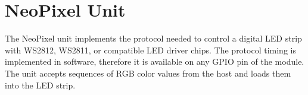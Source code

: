 

\section{NeoPixel Unit}

The NeoPixel unit implements the protocol needed to control a digital LED strip with WS2812, WS2811, or compatible LED driver chips. The protocol timing is implemented in software, therefore it is available on any GPIO pin of the module. The unit accepts sequences of RGB color values from the host and loads them into the LED strip.

